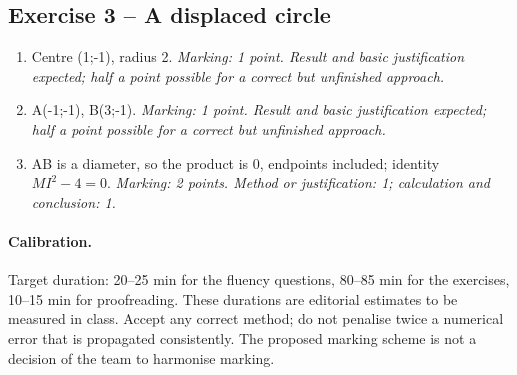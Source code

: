 \subsection*{Exercise 3 -- A displaced circle}
\begin{enumerate}
\item Centre (1;-1), radius 2. \textit{Marking: 1 point. Result and basic justification expected; half a point possible for a correct but unfinished approach.}
\item A(-1;-1), B(3;-1). \textit{Marking: 1 point. Result and basic justification expected; half a point possible for a correct but unfinished approach.}
\item AB is a diameter, so the product is 0, endpoints included; identity $MI^2-4=0$. \textit{Marking: 2 points. Method or justification: 1; calculation and conclusion: 1.}
\end{enumerate}
\paragraph{Calibration.} Target duration: 20--25 min for the fluency questions, 80--85 min for the exercises, 10--15 min for proofreading. These durations are editorial estimates to be measured in class. Accept any correct method; do not penalise twice a numerical error that is propagated consistently. The proposed marking scheme is not a decision of the team to harmonise marking.
